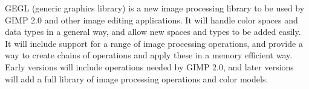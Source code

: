 GEGL (generic graphics library) is a new image processing library to be used by
GIMP 2.0 and other image editing applications. It will handle color spaces and
data types in a general way, and allow new spaces and types to be added easily.
It will include support for a range of image processing operations, and provide
a way to create chains of operations and apply these in a memory efficient way.
Early versions will include operations needed by GIMP 2.0, and later versions 
will add a full library of image processing operations and color models.
